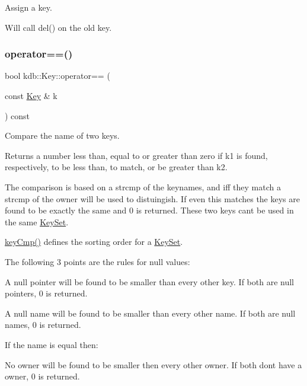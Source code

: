 Assign a key. 

Will call del() on the old key. \mbox{\label{classkdb_1_1Key_ae52e7f4c4461db5356ddeef64a870cad}} 
\subsubsection{\texorpdfstring{operator==()}{operator==()}}
{\footnotesize\ttfamily bool kdb\+::\+Key\+::operator== (\begin{DoxyParamCaption}\item[{const \hyperlink{classkdb_1_1Key}{Key} \&}]{k }\end{DoxyParamCaption}) const\hspace{0.3cm}{\ttfamily [inline]}}



Compare the name of two keys. 

\begin{DoxyReturn}{Returns}
a number less than, equal to or greater than zero if k1 is found, respectively, to be less than, to match, or be greater than k2.
\end{DoxyReturn}
The comparison is based on a strcmp of the keynames, and iff they match a strcmp of the owner will be used to distuingish. If even this matches the keys are found to be exactly the same and 0 is returned. These two keys can\textquotesingle{}t be used in the same \hyperlink{classkdb_1_1KeySet}{Key\+Set}.

\hyperlink{group__keytest_gaf6e66e12fe04d535a5d1c8218ced803e}{key\+Cmp()} defines the sorting order for a \hyperlink{classkdb_1_1KeySet}{Key\+Set}.

The following 3 points are the rules for null values\+:


\begin{DoxyItemize}
\item A null pointer will be found to be smaller than every other key. If both are null pointers, 0 is returned.
\item A null name will be found to be smaller than every other name. If both are null names, 0 is returned.
\end{DoxyItemize}

If the name is equal then\+:


\begin{DoxyItemize}
\item No owner will be found to be smaller then every other owner. If both don\textquotesingle{}t have a owner, 0 is returned.
\end{DoxyItemize}

